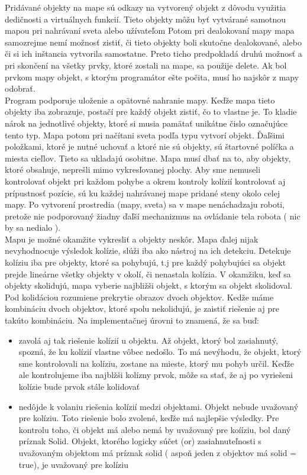 Pridávané objekty na mape sú odkazy na vytvorený objekt z dôvodu využitia dedičnosti a virtuálnych funkcií. Tieto objekty môžu byť vytvárané samotnou mapou pri nahrávaní sveta alebo užívateľom  Potom pri dealokovaní mapy mapa samozrejme nemí možnosť zistiť, či tieto objekty boli skutočne dealokované, alebo či si ich inštancia vytvorila samostatne. Preto ticho predpokladá druhú možnosť a pri skončení na všetky prvky, ktoré zostali na mape, sa použije delete. Ak bol prvkom mapy objekt, s ktorým programátor ešte počita, musí ho najskôr z mapy odobrať. %
\\
Program podporuje uloženie a opätovné nahranie mapy. Keďže mapa tieto objekty iba zobrazuje, postačí pre každý objekt zistiť, čo to vlastne je. To kladie nárok na jednotlivé objekty, ktoré si musia pamätať unikátne čislo označujúce tento typ. Mapa potom pri načítani sveta podľa typu vytvorí objekt. Ďaľšimi položkami, ktoré je nutné uchovať a ktoré nie sú objekty, sú štartovné políčka a miesta cieľlov. Tieto sa ukladajú osobitne. %
Mapa musí dbať na to, aby objekty, ktoré obsahuje, neprešli mimo vykresľovanej plochy. Aby sme nemuseli kontrolovať objekt pri každom pohybe a okrem kontroly kolízií kontrolovať aj prípustnosť pozície, sú ku každej nahrávanej mape pridané steny okolo celej mapy. 
Po vytvorení prostredia (mapy, sveta) sa v mape nenáchadzaju roboti, pretože nie podporovaný žiadny ďaľší mechanizmus na ovládanie tela robota ( nic by sa nedialo ). \\
Mapu je možné okamžite vykresliť a objekty neskôr.
Mapa ďalej nijak nevyhodnocuje výsledok kolízie, slúži iba ako nástroj na ich detekciu. Detekuje kolíziu iba pre objekty, ktoré sa pohybujú, t.j pre každý pohybujúci sa objekt prejde lineárne všetky objekty v okolí, či nenastala kolízia. V okamžiku, keď sa objekty skolidujú, mapa vyberie najbližši objekt, s ktorým sa objekt skolidoval. Pod kolidáciou rozumiene prekrytie obrazov dvoch objektov. Kedže máme kombináciu dvoch objektov, ktoré spolu nekolidujú, je zaistiť riešenie aj pre takúto kombináciu. Na implementačnej úrovni to znamená, že sa buď:
\begin{itemize} %
\item zavolá aj tak riešenie kolízií u objektu. Až objekt, ktorý bol zasiahnutý, spozná, že ku kolízií vlastne vôbec nedošlo. To má nevýhodu, že objekt, ktorý sme kontrolovali na kolíziu, zostane na mieste, ktorý mu pohyb určil. Keďže ale kontrolujeme iba najblžši kolízny prvok, môže sa stať, že aj po vyriešeni kolízie bude prvok stále kolidovať
\item nedôjde k volaniu riešenia kolízií medzi objektami. Objekt nebude uvažovaný pre kolíziu. Toto riešenie bolo zvolené, keďže má najlepšie výsledky. Pre kontrolu toho, či objekt má alebo nemá by uvažovaný pre koííziu, bol daný príznak Solid. Objekt, ktorého logicky súčet (or) zasiahnuteľnosti s uvažovaným objektom má príznak solid ( aspoň jeden z objektov má solid =  true),  je uvažovaný pre kolíziu
\end{itemize}
